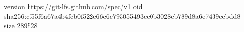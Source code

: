 version https://git-lfs.github.com/spec/v1
oid sha256:cf55f6a67a4b4fcb0f522e66c6c793055493cc0b3028cb789d8a6e7439cebdd8
size 289528
